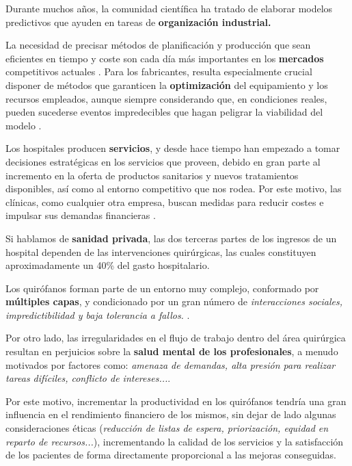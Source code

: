 Durante muchos años, la comunidad científica ha tratado de elaborar modelos predictivos que ayuden en tareas de \textbf{organización industrial.}

La necesidad de precisar métodos de planificación y producción que sean eficientes en tiempo y coste son cada día más importantes en los \textbf{mercados} competitivos actuales \cite{Geurtsen2023ProductionReview}. Para los fabricantes, resulta especialmente crucial disponer de métodos que garanticen la \textbf{optimización} del equipamiento y los recursos empleados, aunque siempre considerando que, en condiciones reales, pueden sucederse eventos impredecibles que hagan peligrar la viabilidad del modelo \cite{Geurtsen2023ProductionReview}.

Los hospitales producen \textbf{servicios}, y desde hace tiempo han empezado a tomar decisiones estratégicas en los servicios que proveen, debido en gran parte al incremento en la oferta de productos sanitarios y nuevos tratamientos disponibles, así como al entorno competitivo que nos rodea.
Por este motivo, las clínicas, como cualquier otra empresa, buscan medidas para reducir costes e impulsar sus demandas financieras \cite{Maleki2023AMoment}.

Si hablamos de \textbf{sanidad privada}, las dos terceras partes de los ingresos de un hospital dependen de las intervenciones quirúrgicas, las cuales constituyen aproximadamente un 40\% del gasto hospitalario\cite{Pham2008SurgicalProblem}.

Los quirófanos forman parte de un entorno muy complejo, conformado por \textbf{múltiples capas}, y condicionado por un gran número de \textit{interacciones sociales, impredictibilidad y baja tolerancia a fallos.} \cite{Rothstein2018OperatingEfficiency}. 

Por otro lado, las irregularidades en el flujo de trabajo dentro del área quirúrgica resultan en perjuicios sobre la \textbf{salud mental de los profesionales}, a menudo motivados por factores como: \textit{amenaza de demandas, alta presión para realizar tareas difíciles, conflicto de intereses...}\cite{Wheelock2015TheTeamwork}.

Por este motivo, incrementar la productividad en los quirófanos tendría una gran influencia en el rendimiento financiero de los mismos, sin dejar de lado algunas consideraciones éticas (\textit{reducción de listas de espera, priorización, equidad en reparto de recursos...}), incrementando la calidad de los servicios y la satisfacción de los pacientes de forma directamente proporcional a las mejoras conseguidas.

